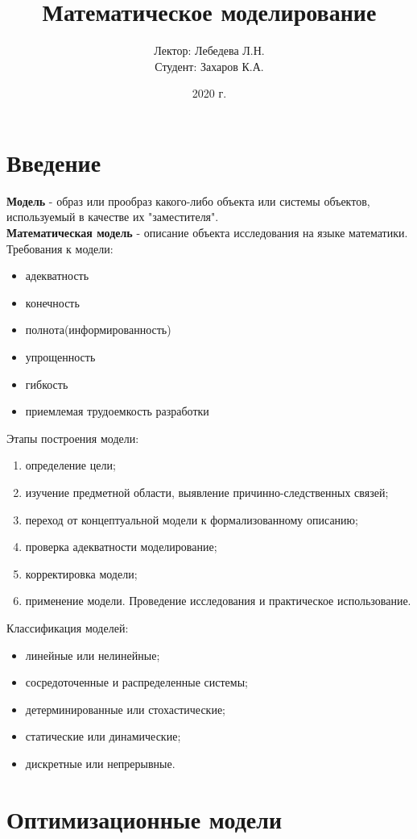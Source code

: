 \documentclass[12pt]{article}
\title{Математическое моделирование}
\author{Лектор: Лебедева Л.Н.\\Студент: Захаров К.А.}
\date{2020 г.}
\theoremstyle{definition}
\theoremstyle{remark}
\begin{document}
\maketitle
\tableofcontents
\section{Введение}
\textbf{Модель} - образ или прообраз какого-либо объекта или системы объектов, используемый в качестве их "заместителя".\\
\textbf{Математическая модель} - описание объекта исследования на языке математики.\\
Требования к модели:
\begin{itemize}
  \item адекватность
  \item конечность
  \item полнота(информированность)
  \item упрощенность
  \item гибкость
  \item приемлемая трудоемкость разработки
\end{itemize}
Этапы построения модели:
\begin{enumerate}
  \item определение цели;
  \item изучение предметной области, выявление причинно-следственных связей;
  \item переход от концептуальной модели к формализованному описанию;
  \item проверка адекватности моделирование;
  \item корректировка модели;
  \item применение модели. Проведение исследования и практическое использование.
\end{enumerate}
Классификация моделей:
\begin{itemize}
  \item линейные или нелинейные;
  \item сосредоточенные и распределенные системы;
  \item детерминированные или стохастические;
  \item статические или динамические;
  \item дискретные или непрерывные.
\end{itemize}





\section{Оптимизационные модели}
\end{document}
